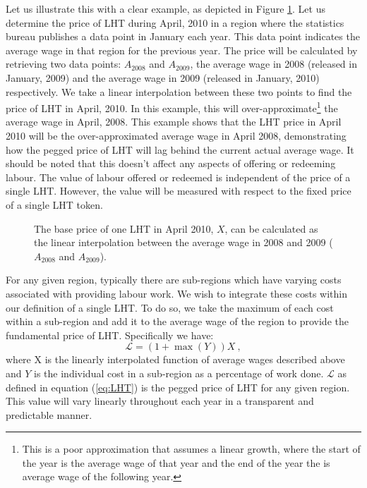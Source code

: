 \begin{multicols}{2}
Let us illustrate this with a clear example, as depicted in Figure \ref{fig:pegged-price}. Let us determine the price of LHT during April, 2010 in a region where the statistics bureau publishes a data point in January each year. This data point indicates the average wage in that region for the previous year. The price will be calculated by retrieving two data points: $A_{2008}$ and $A_{2009}$, the average wage in 2008 (released in January, 2009) and the average wage in 2009 (released in January, 2010) respectively. We take a linear interpolation between these two points to find the price of LHT in April, 2010. In this example, this will over-approximate\footnote{This is a poor approximation that assumes a linear growth, where the start of the year is the average wage of that year and the end of the year the is average wage of the following year.} the average wage in April, 2008. This example shows that the LHT price in April 2010 will be the over-approximated average wage in April 2008, demonstrating how the pegged price of LHT will lag behind the current actual average wage. It should be noted that this doesn't affect any aspects of offering or redeeming labour. The value of labour offered or redeemed is independent of the price of a single LHT. However, the value will be measured with respect to the fixed price of a single LHT token.  

\begin{figure}[H]
	\centering
	\def\svgwidth{\columnwidth}
	
	\caption{The base price of one LHT in April 2010, $X$, can be calculated as the linear interpolation between the average wage in 2008 and 2009 ($A_{2008}$ and $A_{2009}$).}
	\label{fig:pegged-price}
\end{figure}

For any given region, typically there are sub-regions which have varying costs associated with providing labour work. We wish to integrate these costs within our definition of a single LHT. To do so, we take the maximum of each cost within a sub-region and add it to the average wage of the region to provide the fundamental price of LHT. Specifically we have: 
\begin{equation}
  \mathcal{L} = \left(1 + \max(Y)  \right) X ~,
  \label{eq:LHT}
\end{equation}
where X is the linearly interpolated function of average wages described above and $Y$ is the individual cost in a sub-region as a percentage of work done. $\mathcal{L}$ as defined in equation (\ref{eq:LHT}) is the pegged price of LHT for any given region. This value will vary linearly throughout each year in a transparent and predictable manner. 



\end{multicols}
